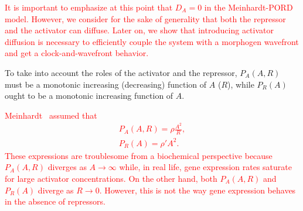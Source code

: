 \documentclass[%
 preprint,
 aip, 
 amsmath,amssymb,
]{revtex4-2}
\begin{document}
\textcolor{red}{It is important to emphasize at this point that $D_A = 0$ in the Meinhardt-PORD model. However, we consider for the sake of generality that both the repressor and the activator can diffuse. Later on, we show that introducing activator diffusion is necessary to efficiently couple the system with a morphogen wavefront and get a clock-and-wavefront behavior.}
	
To take into account the roles of the activator and the repressor, $P_A(A, R)$ must be a monotonic increasing (decreasing) function of $A$ ($R$), while $P_R(A)$ ought to be a monotonic increasing function of $A$. 

\textcolor{red}{Meinhardt~\cite{Meinhardt1982} assumed that
	\begin{subequations}\label{eq034a}
		\begin{gather}
		P_A(A, R) = \displaystyle \rho \frac{A^2}{R}, \label{eq03a} \\[3mm]
		P_R(A) = \rho' A^2. \label{eq04a}
		\end{gather}
	\end{subequations}
These expressions are troublesome from a biochemical perspective because $P_A(A, R)$ diverges as $A \to \infty$ while, in real life, gene expression rates saturate for large activator concentrations. On the other hand, both $P_A(A, R)$ and $P_R(A)$ diverge as $R \to 0$. However, this is not the way gene expression behaves in the absence of repressors.} 
\end{document}
